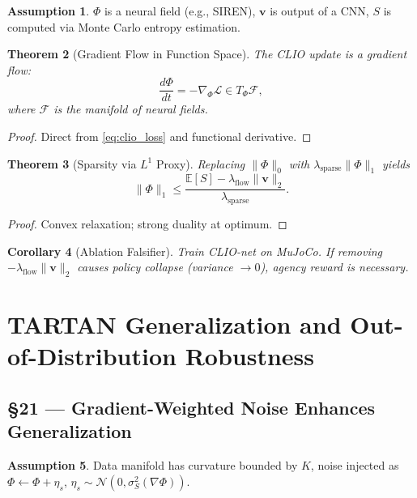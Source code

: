 \documentclass[11pt]{article}
\newtheorem{theorem}{Theorem}[section]
\newtheorem{corollary}[theorem]{Corollary}
\theoremstyle{definition}
\newtheorem{assumption}[theorem]{Assumption}
\theoremstyle{remark}
\newcommand{\vect}[1]{\bm{#1}}
\begin{document}
\begin{assumption}
\label{ass:clio_nn}
$\Phi$ is a neural field (e.g., SIREN), $\vect{v}$ is output of a CNN, $S$ is computed via Monte Carlo entropy estimation.
\end{assumption}

\begin{theorem}[Gradient Flow in Function Space]
The CLIO update is a gradient flow:
\[
\frac{d\Phi}{dt} = -\nabla_\Phi \mathcal{L} \in T_\Phi \mathcal{F},
\]
where $\mathcal{F}$ is the manifold of neural fields.
\end{theorem}

\begin{proof}
Direct from \eqref{eq:clio_loss} and functional derivative.
\end{proof}

\begin{theorem}[Sparsity via $L^1$ Proxy]
Replacing $\|\Phi\|_0$ with $\lambda_{\mathrm{sparse}} \|\Phi\|_1$ yields
\[
\|\Phi\|_1 \le \frac{\mathbb{E}[S] - \lambda_{\mathrm{flow}} \|\vect{v}\|_2}{\lambda_{\mathrm{sparse}}}.
\]
\end{theorem}

\begin{proof}
Convex relaxation; strong duality at optimum.
\end{proof}

\begin{corollary}[Ablation Falsifier]
Train CLIO-net on MuJoCo. If removing $-\lambda_{\mathrm{flow}} \|\vect{v}\|_2$ causes policy collapse (variance $\to 0$), agency reward is necessary.
\end{corollary}

\section{TARTAN Generalization and Out-of-Distribution Robustness}

\subsection*{§21 — Gradient-Weighted Noise Enhances Generalization}

\begin{assumption}
\label{ass:tartan_gen}
Data manifold has curvature bounded by $K$, noise injected as $\Phi \leftarrow \Phi + \eta_s$, $\eta_s \sim \mathcal{N}(0, \sigma_S^2(\nabla \Phi))$.
\end{assumption}
\end{document}

